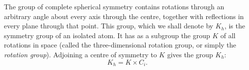 The group of complete spherical symmetry contains rotations through an arbitrary angle about every axis through the centre, together with reflections in every plane through that point. This group, which we shall denote by $K_h$, is the symmetry group of an isolated atom. It has as a subgroup the group $K$ of all rotations in space (called the three-dimensional rotation group, or simply the \emph{rotation group}). Adjoining a centre of symmetry to $K$ gives the group $K_h$:
\[
 K_h=K\times C_i.
\]

